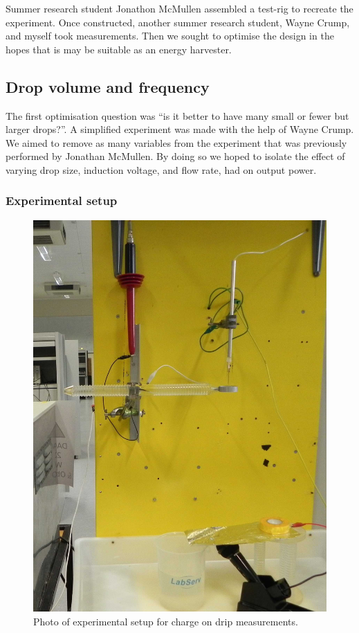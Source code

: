  Summer research student Jonathon McMullen assembled a test-rig to recreate the experiment.
  Once constructed, another summer research student, Wayne Crump, and myself took measurements.
  Then we sought to optimise the design in the hopes that is may be suitable as an energy harvester.


  \subsection*{Drop volume and frequency}

    The first optimisation question was ``is it better to have many small or fewer but larger drops?''.
    A simplified experiment was made with the help of Wayne Crump.
    We aimed to remove as many variables from the experiment that was previously performed by Jonathan McMullen.
    By doing so we hoped to isolate the effect of varying drop size, induction voltage, and flow rate, had on output power.


  \subsubsection*{Experimental setup}

  \begin{figure}[ht]
        \centering
        \includegraphics[scale=0.15]{content/appendices/chargedWaterDrops/graphics/Photo_dripperExperiment_Setup_draft.JPG}
        \caption{\label{Photo_dripperExperiment_Setup}Photo of experimental setup for charge on drip measurements.}
    \end{figure}

